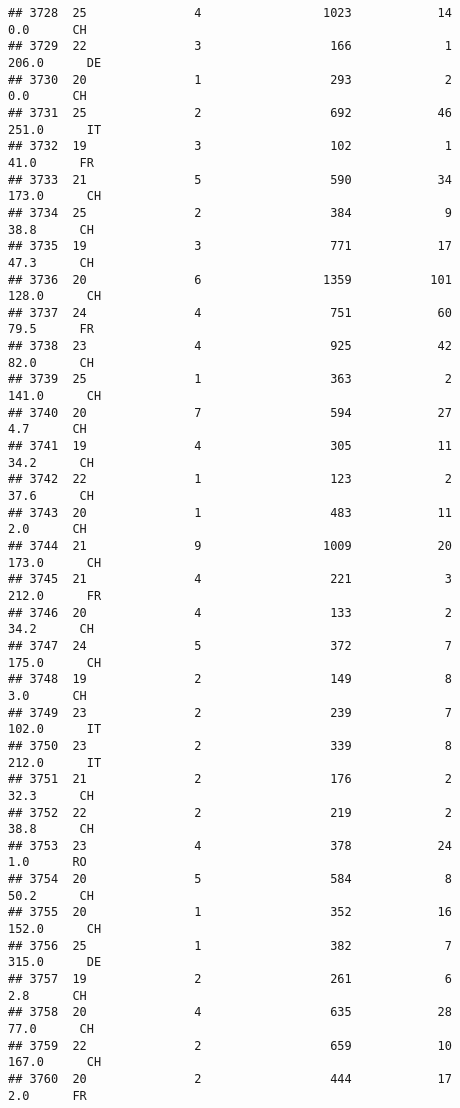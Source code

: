 \documentclass[
]{article}
\begin{document}
\begin{verbatim}
## 3728  25               4                 1023            14      0.0      CH
## 3729  22               3                  166             1    206.0      DE
## 3730  20               1                  293             2      0.0      CH
## 3731  25               2                  692            46    251.0      IT
## 3732  19               3                  102             1     41.0      FR
## 3733  21               5                  590            34    173.0      CH
## 3734  25               2                  384             9     38.8      CH
## 3735  19               3                  771            17     47.3      CH
## 3736  20               6                 1359           101    128.0      CH
## 3737  24               4                  751            60     79.5      FR
## 3738  23               4                  925            42     82.0      CH
## 3739  25               1                  363             2    141.0      CH
## 3740  20               7                  594            27      4.7      CH
## 3741  19               4                  305            11     34.2      CH
## 3742  22               1                  123             2     37.6      CH
## 3743  20               1                  483            11      2.0      CH
## 3744  21               9                 1009            20    173.0      CH
## 3745  21               4                  221             3    212.0      FR
## 3746  20               4                  133             2     34.2      CH
## 3747  24               5                  372             7    175.0      CH
## 3748  19               2                  149             8      3.0      CH
## 3749  23               2                  239             7    102.0      IT
## 3750  23               2                  339             8    212.0      IT
## 3751  21               2                  176             2     32.3      CH
## 3752  22               2                  219             2     38.8      CH
## 3753  23               4                  378            24      1.0      RO
## 3754  20               5                  584             8     50.2      CH
## 3755  20               1                  352            16    152.0      CH
## 3756  25               1                  382             7    315.0      DE
## 3757  19               2                  261             6      2.8      CH
## 3758  20               4                  635            28     77.0      CH
## 3759  22               2                  659            10    167.0      CH
## 3760  20               2                  444            17      2.0      FR

\end{verbatim}
\end{document}
